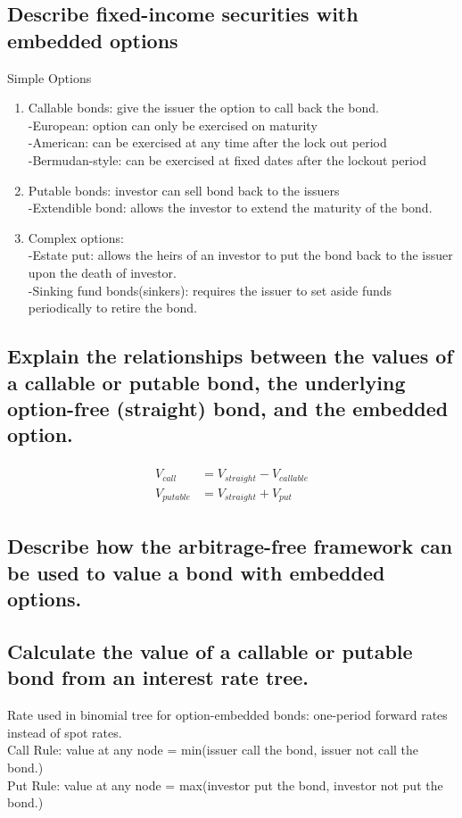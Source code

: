 \documentclass{article}
\newcommand{\be}{\begin{enumerate}}
\newcommand{\ee}{\end{enumerate}}
\newcommand{\eq}[1]{\begin{align*}\begin{split}#1\end{split}\end{align*}}
\begin{document}
\subsection{Describe fixed-income securities with embedded options}
Simple Options
\be
    \item Callable bonds: give the issuer the option to call back the bond.
        \\-European: option can only be exercised on maturity
        \\-American: can be exercised at any time after the lock out period
        \\-Bermudan-style: can be exercised at fixed dates after the lockout period
    \item Putable bonds: investor can sell bond back to the issuers
        \\-Extendible bond: allows the investor to extend the maturity of the bond.
    \item Complex options:
        \\-Estate put: allows the heirs of an investor to put the bond back to the issuer
        upon the death of investor.
        \\-Sinking fund bonds(sinkers): requires the issuer to set aside funds periodically
        to retire the bond.
\ee
\subsection{Explain the relationships between the values of a callable or putable
bond, the underlying option-free (straight) bond, and the embedded option.}
\eq{
    V_{call}&=V_{straight}-V_{callable}\\
    V_{putable}&=V_{straight}+V_{put}
}   
\subsection{Describe how the arbitrage-free framework can be used to value a 
bond with embedded options.}
\subsection{Calculate the value of a callable or putable bond from an interest rate
tree.}
Rate used in binomial tree for option-embedded bonds: one-period forward rates instead
of spot rates.
\\ Call Rule: value at any node = min(issuer call the bond, issuer not call the bond.)
\\ Put Rule: value at any node = max(investor put the bond, investor not put the bond.)
\end{document}
